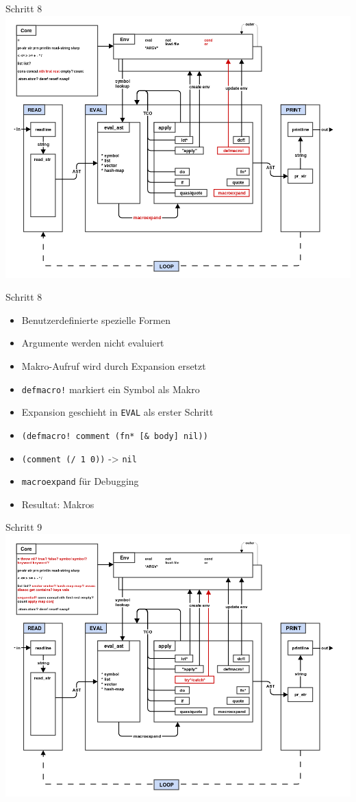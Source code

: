 \documentclass[presentation]{beamer}
\begin{document}
\begin{frame}[label=sec-3-22]{Schritt 8}
\includegraphics[width=.9\linewidth]{./images/step8_macros.png}
\end{frame}

\begin{frame}[fragile,label=sec-3-23]{Schritt 8}
 \begin{itemize}
\item Benutzerdefinierte spezielle Formen
\item Argumente werden nicht evaluiert
\item Makro-Aufruf wird durch Expansion ersetzt
\item \texttt{defmacro!} markiert ein Symbol als Makro
\item Expansion geschieht in \texttt{EVAL} als erster Schritt
\item \texttt{(defmacro! comment (fn* [\& body] nil))}
\item \texttt{(comment (/ 1 0))} -> \texttt{nil}
\item \texttt{macroexpand} für Debugging
\item Resultat: Makros
\end{itemize}
\end{frame}

\begin{frame}[label=sec-3-24]{Schritt 9}
\includegraphics[width=.9\linewidth]{./images/step9_try.png}
\end{frame}
\end{document}

